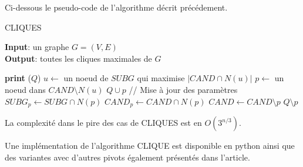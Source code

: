 \documentclass[a4paper, 12pt]{article}
\begin{document}
Ci-dessous le pseudo-code de l'algorithme décrit précédement.
\begin{algorithm}
  \caption{CLIQUES}
  \textbf{Input}: un graphe $G = (V,E)$\\
  \textbf{Output}: toutes les cliques maximales de $G$
  \begin{algorithmic}[1]
       
        \State \textbf{print} ($ Q $)
      \Else
        \State $u \gets$ un noeud de $SUBG$ qui maximise $|CAND \cap N(u)|$
          \State $p \gets$ un noeud dans $CAND \setminus N(u)$
          \State $ Q \cup p $ 
          \State // Mise à jour des paramètres
          \State $SUBG_p \gets SUBG \cap N(p)$
          \State $CAND_p \gets CAND \cap N(p)$
          \State {}
          \State $CAND \gets CAND \setminus {p}$
          \State $ Q \setminus p $ 
        \EndWhile
      \EndIf
    \EndProcedure
    \State {}
  \end{algorithmic}
\end{algorithm}

La complexité dans le pire des cas de CLIQUES est en $ O(3^{n/3}) $\cite{contetomita}.

Une implémentation de l'algorithme CLIQUE est disponible en python ainsi que des variantes avec d'autres pivots également présentés dans l'article.





\end{document}
